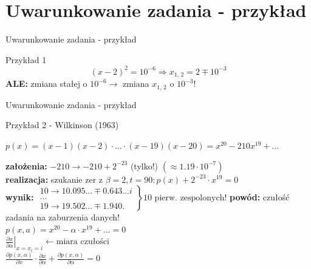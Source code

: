\section{Uwarunkowanie zadania - przykład}
\begin{frame}{Uwarunkowanie zadania - przykład}
	\begin{exampleblock}{Przykład 1}
    	\[
        	(x-2)^2 = 10^{-6} \Rightarrow x_\text{1, 2} = 2 \mp 10^{-3}
        \]
        {\bf ALE:} zmiana stałej o $10^{-6} \rightarrow$ zmiana $x_\text{1, 2}$ o $10^{-3}$!
    \end{exampleblock}
\end{frame}
\begin{frame}{Uwarunkowanie zadania - przykład}
	\begin{exampleblock}{Przykład 2 - Wilkinson (1963)}
    
    	\vspace{.1cm}
        \(
        	p(x) = (x-1)(x-2) \cdot ... \cdot (x-19)(x-20) = x^{20} - 210x^{19} + ...
        \) \vspace{.2cm}
        
        {\bf założenia:} $-210 \to -210 +2^{-23}$ (tylko!) $(\approx 1.19 \cdot 10^{-7})$ \\
        {\bf realizacja:} szukanie zer z $\beta = 2, t = 90: p(x) + 2^{-23} \cdot x^{19} = 0$ \\
        {\bf wynik:} \(
            \left.
            	\begin{array}{ll}
                10 \to 10.095 ... \mp 0.643...i \\
                ... \\
                19 \to 19.502 ... \mp 1.940 .
                \end{array}
            \right\rbrace \text{10 pierw. zespolonych!}
        \)
        {\bf powód:} czułość zadania na zaburzenia danych! \\
        
        \centering
        \(
            p(x,a) = x^{20} - \alpha \cdot x^{19} + ... = 0
        \) \\ \vspace{.1cm}
        \(
            \left.
            \frac{ 
                \partial x
            }{
                \partial \alpha
            } 
            \right|_{x=x_i=i}
            \leftarrow \text{miara czułości}
        \) \\ \vspace{.1cm}
        \(
        	\frac{
            	\partial p(x,\alpha)
            }{
            	\partial x
            } \cdot \frac{
            	\partial x
            }{
            	\partial \alpha
            } + \frac{
            	\partial p(x, \alpha)
            }{
            	\partial \alpha
            } = 0
        \)
	\end{exampleblock}
\end{frame}
